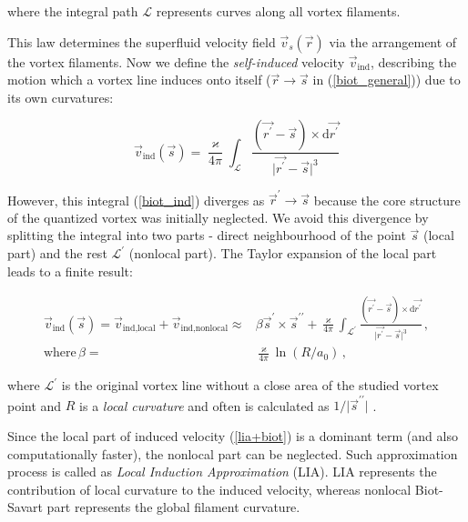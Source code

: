 where the integral path $\mathcal{L}$ represents curves along all vortex filaments.

This law determines the superfluid velocity field $\vec{v}_s(\vec{r})$ via the arrangement of the vortex filaments. Now we define the \textit{self-induced} velocity $\vec{v}_{\text{ind}}$, describing the motion which a vortex line induces onto itself ($\vec{r} \rightarrow \vec{s}$ in (\ref{biot_general})) due to its own curvatures:

\begin{equation}
\vec{v}_{\text{ind}}(\vec{s}) = \frac{\varkappa}{4\pi} \int_{\mathcal{L}} \frac{(\vec{r^{\prime}} - \vec{s}) \times \text{d}\vec{r^{\prime}}}{\vert \vec{r^{\prime}} - \vec{s} \vert^3}
\label{biot_ind}
\end{equation}

However, this integral (\ref{biot_ind}) diverges as $\vec{r}^{\prime} \rightarrow \vec{s}$ because the core structure
of the quantized vortex was initially neglected. We avoid this divergence by splitting the integral into two parts - direct neighbourhood of the point $\vec{s}$ (local part) and the rest $\mathcal{L}^{\prime}$ (nonlocal part). The Taylor expansion of the local part leads \cite{schwarz} to a finite result:

\begin{align}
\vec{v}_{\text{ind}}(\vec{s})
= \vec{v}_{\text{ind,local}} + \vec{v}_{\text{ind,nonlocal}}
\approx& \beta \vec{s}^{\prime} \times \vec{s}^{\prime \prime} + \frac{\varkappa}{4\pi} \int_{\mathcal{L}^{\prime}} \frac{(\vec{r^{\prime}} - \vec{s}) \times \text{d}\vec{r^{\prime}}}{\vert \vec{r^{\prime}} - \vec{s} \vert^3}\,,
\label{lia+biot}
\\
\text{where}\, \beta =& \frac{\varkappa}{4\pi} \ln(R / a_0)\,,
\label{beta}
\end{align}

where $\mathcal{L}^{\prime}$ is the original vortex line without a close area of the studied vortex point and $R$ is a \textit{local curvature} and often is calculated as $1 / \vert \vec{s}^{\prime\prime} \vert$ \cite{schwarz}.

Since the local part of induced velocity (\ref{lia+biot}) is a dominant term (and also computationally faster), the nonlocal part can be neglected. Such approximation process is called as \textit{Local Induction Approximation} (LIA). LIA represents the contribution of local curvature to the induced velocity, whereas nonlocal Biot-Savart part represents the global filament curvature.

